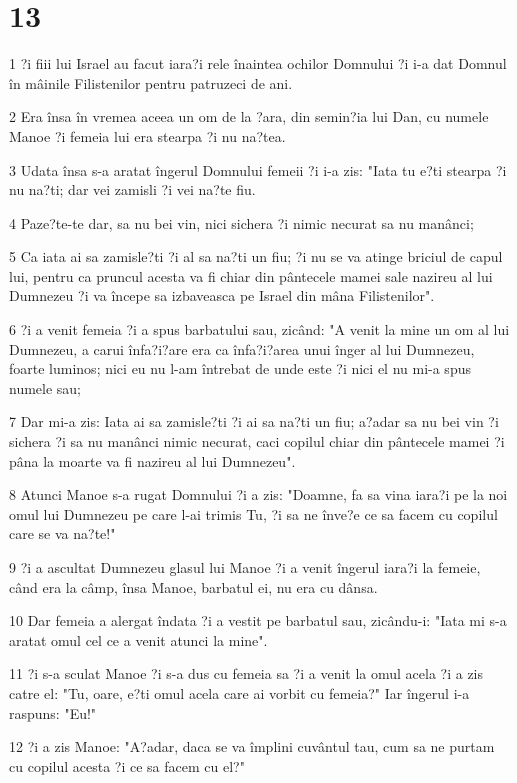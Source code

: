 \chapter{13}

\par 1 ?i fiii lui Israel au facut iara?i rele înaintea ochilor Domnului ?i i-a dat Domnul în mâinile Filistenilor pentru patruzeci de ani.
\par 2 Era însa în vremea aceea un om de la ?ara, din semin?ia lui Dan, cu numele Manoe ?i femeia lui era stearpa ?i nu na?tea.
\par 3 Udata însa s-a aratat îngerul Domnului femeii ?i i-a zis: "Iata tu e?ti stearpa ?i nu na?ti; dar vei zamisli ?i vei na?te fiu.
\par 4 Paze?te-te dar, sa nu bei vin, nici sichera ?i nimic necurat sa nu manânci;
\par 5 Ca iata ai sa zamisle?ti ?i al sa na?ti un fiu; ?i nu se va atinge briciul de capul lui, pentru ca pruncul acesta va fi chiar din pântecele mamei sale nazireu al lui Dumnezeu ?i va începe sa izbaveasca pe Israel din mâna Filistenilor".
\par 6 ?i a venit femeia ?i a spus barbatului sau, zicând: "A venit la mine un om al lui Dumnezeu, a carui înfa?i?are era ca înfa?i?area unui înger al lui Dumnezeu, foarte luminos; nici eu nu l-am întrebat de unde este ?i nici el nu mi-a spus numele sau;
\par 7 Dar mi-a zis: Iata ai sa zamisle?ti ?i ai sa na?ti un fiu; a?adar sa nu bei vin ?i sichera ?i sa nu manânci nimic necurat, caci copilul chiar din pântecele mamei ?i pâna la moarte va fi nazireu al lui Dumnezeu".
\par 8 Atunci Manoe s-a rugat Domnului ?i a zis: "Doamne, fa sa vina iara?i pe la noi omul lui Dumnezeu pe care l-ai trimis Tu, ?i sa ne înve?e ce sa facem cu copilul care se va na?te!"
\par 9 ?i a ascultat Dumnezeu glasul lui Manoe ?i a venit îngerul iara?i la femeie, când era la câmp, însa Manoe, barbatul ei, nu era cu dânsa.
\par 10 Dar femeia a alergat îndata ?i a vestit pe barbatul sau, zicându-i: "Iata mi s-a aratat omul cel ce a venit atunci la mine".
\par 11 ?i s-a sculat Manoe ?i s-a dus cu femeia sa ?i a venit la omul acela ?i a zis catre el: "Tu, oare, e?ti omul acela care ai vorbit cu femeia?" Iar îngerul i-a raspuns: "Eu!"
\par 12 ?i a zis Manoe: "A?adar, daca se va împlini cuvântul tau, cum sa ne purtam cu copilul acesta ?i ce sa facem cu el?"
